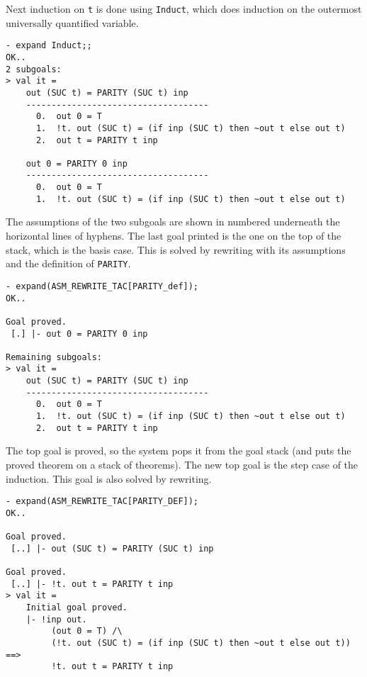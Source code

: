 \noindent Next induction on {\small\verb|t|} is done
using {\small\verb|Induct|}, which does
induction on the outermost universally quantified variable.

\begin{session}
\begin{verbatim}
- expand Induct;;
OK..
2 subgoals:
> val it =
    out (SUC t) = PARITY (SUC t) inp
    ------------------------------------
      0.  out 0 = T
      1.  !t. out (SUC t) = (if inp (SUC t) then ~out t else out t)
      2.  out t = PARITY t inp

    out 0 = PARITY 0 inp
    ------------------------------------
      0.  out 0 = T
      1.  !t. out (SUC t) = (if inp (SUC t) then ~out t else out t)
\end{verbatim}
\end{session}

\noindent The assumptions of the two subgoals
are shown in numbered underneath the horizontal lines of hyphens. The
last goal printed is the one on the top of the stack, which is the
basis case. This is solved by rewriting with its assumptions and the
definition of {\small\verb|PARITY|}.


\begin{session}
\begin{verbatim}
- expand(ASM_REWRITE_TAC[PARITY_def]);
OK..

Goal proved.
 [.] |- out 0 = PARITY 0 inp

Remaining subgoals:
> val it =
    out (SUC t) = PARITY (SUC t) inp
    ------------------------------------
      0.  out 0 = T
      1.  !t. out (SUC t) = (if inp (SUC t) then ~out t else out t)
      2.  out t = PARITY t inp
\end{verbatim}
\end{session}

The top goal is proved, so the system pops it from the goal stack (and
puts the proved theorem on a stack of theorems). The new top goal is
the step case of the induction. This goal is also solved by rewriting.

\begin{session}
\begin{verbatim}
- expand(ASM_REWRITE_TAC[PARITY_DEF]);
OK..

Goal proved.
 [..] |- out (SUC t) = PARITY (SUC t) inp

Goal proved.
 [..] |- !t. out t = PARITY t inp
> val it =
    Initial goal proved.
    |- !inp out.
         (out 0 = T) /\
         (!t. out (SUC t) = (if inp (SUC t) then ~out t else out t)) ==>
         !t. out t = PARITY t inp
\end{verbatim}
\end{session}

